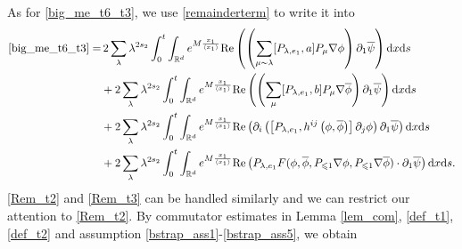 \documentclass[10pt,twoside,a4paper]{article}
\numberwithin{equation}{section}\allowdisplaybreaks
\def\leq{\leqslant}
\begin{document}
As for \eqref{big_me_t6_t3}, we use \eqref{remainderterm} to write it	 into
\begin{align}
	\eqref{big_me_t6_t3} = 
	&\,2\sum_{\lambda} \lambda^{ 2s_2}\int_0^t	   \int_{\mathbb{R}^{d}}  
 e^{M \frac{x_1}{\langle x_1\rangle} } \mathrm{Re} \left(  \left(\sum_{\mu\sim \lambda} [  P_{\lambda, e_1},a  ]  P_\mu \nabla \phi\right)\partial_1  \overline{\psi}\right)      \mathrm{d} x  \mathrm{d} s\label{Rem_t2}\\
	&+2\sum_{\lambda} \lambda^{ 2s_2}\int_0^t	\int_{\mathbb{R}^{d}}    e^{M \frac{x_1}{\langle x_1\rangle} }\mathrm{Re} \left(  \left( \sum_{\mu}  [P_{\lambda, e_1},b ]  P_\mu \nabla\overline{ \phi }\right)\partial_1  \overline{\psi}\right)      \mathrm{d} x \mathrm{d} s \label{Rem_t3}\\
	&+2\sum_{\lambda} \lambda^{ 2s_2}\int_0^t	\int_{\mathbb{R}^{d}}    e^{M \frac{x_1}{\langle x_1\rangle} }\mathrm{Re} \left(   \partial_i\left(\left[P_{\lambda, e_1}, h^{ij}\left(\phi,\overline{\phi}\right) \right]  \partial_j  \phi \right)\partial_1  \overline{\psi}\right)     \mathrm{d} x  \mathrm{d} s \label{Rem_t4}\\
	&+ 2\sum_{\lambda} \lambda^{ 2s_2}\int_0^t	\int_{\mathbb{R}^{d}}    e^{M \frac{x_1}{\langle x_1\rangle} }\mathrm{Re} \left( P_{\lambda, e_1}  F(\phi, \overline{\phi}, P_{\leq 1} \nabla \phi,  P_{\leq 1} \nabla \overline{\phi})\cdot\partial_1  \overline{\psi}\right)     \mathrm{d} x  \mathrm{d} s. \label{Rem_t1}
\end{align}
\eqref{Rem_t2} and \eqref{Rem_t3} can be handled similarly and we can restrict our attention to \eqref{Rem_t2}.
By commutator estimates in Lemma \ref{lem_com}, \eqref{def_t1}, \eqref{def_t2} and assumption \eqref{bstrap_ass1}-\eqref{bstrap_ass5}, we obtain
\end{document}
